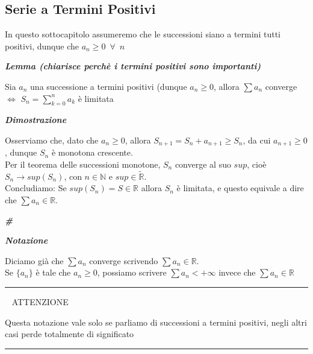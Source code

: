 \documentclass{article}
\theoremstyle{definition}
\newcommand{\R}{\mathbb{R}}
\newcommand{\N}{\mathbb{N}}
\newcommand{\cvd}{\begin{center} \textbf{\textit{\#}} \end{center}}
\begin{document}
\newpage
\subsection{Serie a Termini Positivi}
In questo sottocapitolo assumeremo che le successioni siano a termini tutti positivi, dunque che $a_n \geqslant 0 \,\,\, \forall \,\,\, n$
\begin{center}
    \textbf{\textit{Lemma (chiarisce perchè i termini positivi sono importanti)}}
\end{center}
Sia $a_n$ una successione a termini positivi (dunque $a_n \geqslant 0$, allora $\sum a_n$ converge $\Longleftrightarrow \,\, S_n= \sum_{k=0}^n a_k$ è limitata
\begin{center}
    \textbf{\textit{Dimostrazione}}
\end{center}
Osserviamo che, dato che $a_n \geqslant 0$, allora $S_{n+1}=S_n+ a_{n+1} \geqslant S_n$, da cui $a_{n+1} \geqslant 0$, dunque $S_n$ è monotona crescente.
\\
Per il teorema delle successioni monotone, $S_n$ converge al suo $sup$, cioè $S_n \to sup(S_n)$, con $n \in \N$ e $sup \in \tilde{\R}$.
\\
Concludiamo: Se $sup(S_n)=S \in \R$ allora $S_n$ è limitata, e questo equivale a dire che $\sum a_n \in \R$.
\\
\cvd
\begin{center}
    \textbf{\textit{Notazione}}
\end{center}
Diciamo già che $\sum a_n$ converge scrivendo $\sum a_n \in \R$.
\\
Se $\{a_n\}$ è tale che $a_n \geqslant 0$, possiamo scrivere $\sum a_n < +\infty$ invece che $\sum a_n \in \R$

\vspace{15pt}
\hrule
\vspace{15pt}

\begin{center}
  \warning \,\,\, ATTENZIONE \,\,\, \warning
\end{center}
Questa notazione vale solo se parliamo di successioni a termini positivi, negli altri casi perde totalmente di significato

\vspace{15pt}
\hrule
\vspace{15pt}
\end{document}
